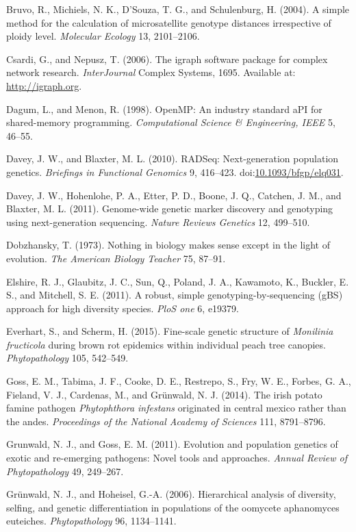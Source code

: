 \documentclass{frontiersSCNS} %
\begin{document}
Bruvo, R., Michiels, N. K., D'Souza, T. G., and Schulenburg, H. (2004).
A simple method for the calculation of microsatellite genotype distances
irrespective of ploidy level. \emph{Molecular Ecology} 13, 2101--2106.

Csardi, G., and Nepusz, T. (2006). The igraph software package for
complex network research. \emph{InterJournal} Complex Systems, 1695.
Available at: \url{http://igraph.org}.

Dagum, L., and Menon, R. (1998). OpenMP: An industry standard aPI for
shared-memory programming. \emph{Computational Science \& Engineering,
IEEE} 5, 46--55.

Davey, J. W., and Blaxter, M. L. (2010). RADSeq: Next-generation
population genetics. \emph{Briefings in Functional Genomics} 9,
416--423.
doi:\href{http://dx.doi.org/10.1093/bfgp/elq031}{10.1093/bfgp/elq031}.

Davey, J. W., Hohenlohe, P. A., Etter, P. D., Boone, J. Q., Catchen, J.
M., and Blaxter, M. L. (2011). Genome-wide genetic marker discovery and
genotyping using next-generation sequencing. \emph{Nature Reviews
Genetics} 12, 499--510.

Dobzhansky, T. (1973). Nothing in biology makes sense except in the
light of evolution. \emph{The American Biology Teacher} 75, 87--91.

Elshire, R. J., Glaubitz, J. C., Sun, Q., Poland, J. A., Kawamoto, K.,
Buckler, E. S., and Mitchell, S. E. (2011). A robust, simple
genotyping-by-sequencing (gBS) approach for high diversity species.
\emph{PloS one} 6, e19379.

Everhart, S., and Scherm, H. (2015). Fine-scale genetic structure of
\emph{Monilinia fructicola} during brown rot epidemics within individual
peach tree canopies. \emph{Phytopathology} 105, 542--549.

Goss, E. M., Tabima, J. F., Cooke, D. E., Restrepo, S., Fry, W. E.,
Forbes, G. A., Fieland, V. J., Cardenas, M., and Gr{ü}nwald, N. J.
(2014). The irish potato famine pathogen \emph{Phytophthora infestans}
originated in central mexico rather than the andes. \emph{Proceedings of
the National Academy of Sciences} 111, 8791--8796.

Grunwald, N. J., and Goss, E. M. (2011). Evolution and population
genetics of exotic and re-emerging pathogens: Novel tools and
approaches. \emph{Annual Review of Phytopathology} 49, 249--267.

Gr{ü}nwald, N. J., and Hoheisel, G.-A. (2006). Hierarchical analysis of
diversity, selfing, and genetic differentiation in populations of the
oomycete aphanomyces euteiches. \emph{Phytopathology} 96, 1134--1141.
\end{document}
